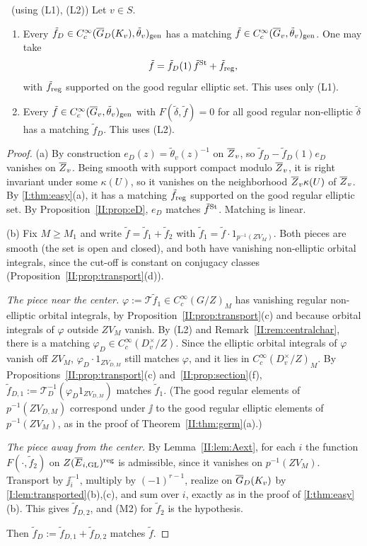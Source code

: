 \begin{theorem}\label{II:thm:matching}\ (using (L1), (L2))
Let $v\in S$.
\begin{enumerate}[label=(\alph*)]
\item Every $\tilde f_D\in C_c^\infty(\overline{G}_D(K_v),\tilde\theta_v)_{\mathrm{gen}}$ has a matching $\tilde f\in C_c^\infty(\overline{G}_v,\tilde\theta_v)_{\mathrm{gen}}$. One may take
\[ \tilde f=\tilde f_D(1)\,\tilde f^{\mathrm{St}}+\tilde f_{\mathrm{reg}}, \]
with $\tilde f_{\mathrm{reg}}$ supported on the good regular elliptic set. This uses only (L1).
\item Every $\tilde f\in C_c^\infty(\overline{G}_v,\tilde\theta_v)_{\mathrm{gen}}$ with $F(\tilde\delta,\tilde f)=0$ for all good regular non-elliptic $\tilde\delta$ has a matching $\tilde f_D$. This uses (L2).
\end{enumerate}
\end{theorem}
\begin{proof}
(a) By construction $e_D(z)=\tilde\theta_v(z)^{-1}$ on $\overline{Z}_v$, so $\tilde f_D-\tilde f_D(1)e_D$ vanishes on $\overline{Z}_v$. Being smooth with support compact modulo $\overline{Z}_v$, it is right invariant under some $\kappa(U)$, so it vanishes on the neighborhood $\overline{Z}_v\kappa(U)$ of $\overline{Z}_v$. By \cref{I:thm:easy}(a), it has a matching $\tilde f_{\mathrm{reg}}$ supported on the good regular elliptic set. By Proposition~\ref{II:prop:eD}, $e_D$ matches $\tilde f^{\mathrm{St}}$. Matching is linear.

(b) Fix $M\ge M_1$ and write $\tilde f=\tilde f_1+\tilde f_2$ with $\tilde f_1=\tilde f\cdot1_{p^{-1}(ZV_M)}$. Both pieces are smooth (the set is open and closed), and both have vanishing non-elliptic orbital integrals, since the cut-off is constant on conjugacy classes (Proposition~\ref{II:prop:transport}(d)).

\emph{The piece near the center.} $\varphi:=\mathcal T\tilde f_1\in C_c^\infty(G/Z)_M$ has vanishing regular non-elliptic orbital integrals, by Proposition~\ref{II:prop:transport}(c) and because orbital integrals of $\varphi$ outside $ZV_M$ vanish. By (L2) and Remark~\ref{II:rem:centralchar}, there is a matching $\varphi_D\in C_c^\infty(D_v^\times/Z)$. Since the elliptic orbital integrals of $\varphi$ vanish off $ZV_M$, $\varphi_D\cdot1_{ZV_{D,M}}$ still matches $\varphi$, and it lies in $C_c^\infty(D_v^\times/Z)_M$. By Propositions~\ref{II:prop:transport}(c) and~\ref{II:prop:section}(f), $\tilde f_{D,1}:=\mathcal T_D^{-1}(\varphi_D1_{ZV_{D,M}})$ matches $\tilde f_1$. (The good regular elements of $p^{-1}(ZV_{D,M})$ correspond under $\jj$ to the good regular elliptic elements of $p^{-1}(ZV_M)$, as in the proof of Theorem~\ref{II:thm:germ}(a).)

\emph{The piece away from the center.} By Lemma~\ref{II:lem:Aext}, for each $i$ the function $F(\cdot,\tilde f_2)$ on $Z(\overline{E}_{i,\mathrm{GL}})^{\mathrm{reg}}$ is admissible, since it vanishes on $p^{-1}(ZV_M)$. Transport by $\jj_i^{-1}$, multiply by $(-1)^{r-1}$, realize on $\overline{G}_D(K_v)$ by \cref{I:lem:transported}(b),(c), and sum over $i$, exactly as in the proof of \cref{I:thm:easy}(b). This gives $\tilde f_{D,2}$, and (M2) for $\tilde f_2$ is the hypothesis.

Then $\tilde f_D:=\tilde f_{D,1}+\tilde f_{D,2}$ matches $\tilde f$.
\end{proof}

